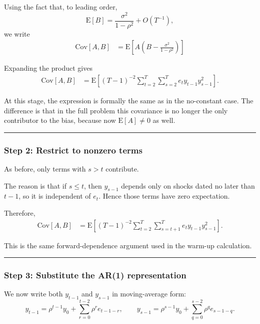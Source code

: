 \documentclass[11pt]{article}
\begin{document}
Using the fact that, to leading order, \[
\text{E}[B] = \frac{\sigma^2}{1-\rho^2} + O(T^{-1}),
\] we write \[
\begin{aligned}
\text{Cov}[A,B]
&=\text{E}\left[A\left(B-\frac{\sigma^2}{1-\rho^2}\right)\right]
\end{aligned}
\]

Expanding the product gives \[
\begin{aligned}
\text{Cov}[A,B]
&=\text{E}\left[(T-1)^{-2}\sum_{t=2}^{T}\sum_{s=2}^{T} e_t y_{t-1}y_{s-1}^2\right].
\end{aligned}
\]

At this stage, the expression is formally the same as in the no-constant
case. The difference is that in the full problem this covariance is no
longer the only contributor to the bias, because now
\(\text{E}[A] \neq 0\) as well.

\begin{center}\rule{0.5\linewidth}{0.5pt}\end{center}

\subsubsection{Step 2: Restrict to nonzero
terms}\label{step-2-restrict-to-nonzero-terms}

As before, only terms with \(s>t\) contribute.

The reason is that if \(s \le t\), then \(y_{s-1}\) depends only on
shocks dated no later than \(t-1\), so it is independent of \(e_t\).
Hence those terms have zero expectation.

Therefore, \[
\begin{aligned}
\text{Cov}[A,B]
&=\text{E}\left[(T-1)^{-2}\sum_{t=2}^{T}\sum_{s=t+1}^{T} e_t y_{t-1}y_{s-1}^2\right].
\end{aligned}
\]

This is the same forward-dependence argument used in the warm-up
calculation.

\begin{center}\rule{0.5\linewidth}{0.5pt}\end{center}

\subsubsection{Step 3: Substitute the AR(1)
representation}\label{step-3-substitute-the-ar1-representation}

We now write both \(y_{t-1}\) and \(y_{s-1}\) in moving-average form: \[
y_{t-1}=\rho^{t-1}y_0+\sum_{r=0}^{t-2}\rho^r e_{t-1-r},
\qquad
y_{s-1}=\rho^{s-1}y_0+\sum_{q=0}^{s-2}\rho^q e_{s-1-q}.
\]
\end{document}
